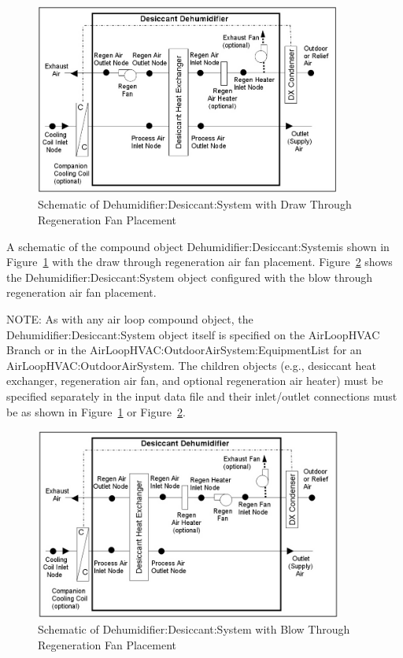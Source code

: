 \begin{figure}[hbtp] %
\centering
\includegraphics[width=0.9\textwidth, height=0.9\textheight, keepaspectratio=true]{media/image409.png}
\caption{Schematic of Dehumidifier:Desiccant:System with Draw Through Regeneration Fan Placement \protect \label{fig:schematic-of-dehumidifier-desiccant-system}}
\end{figure}

A schematic of the compound object Dehumidifier:Desiccant:Systemis shown in Figure~\ref{fig:schematic-of-dehumidifier-desiccant-system} with the draw through regeneration air fan placement. Figure~\ref{fig:schematic-of-dehumidifier-desiccant-system-001} shows the Dehumidifier:Desiccant:System object configured with the blow through regeneration air fan placement.

NOTE: As with any air loop compound object, the Dehumidifier:Desiccant:System object itself is specified on the AirLoopHVAC Branch or in the AirLoopHVAC:OutdoorAirSystem:EquipmentList for an AirLoopHVAC:OutdoorAirSystem. The children objects (e.g., desiccant heat exchanger, regeneration air fan, and optional regeneration air heater) must be specified separately in the input data file and their inlet/outlet connections must be as shown in Figure~\ref{fig:schematic-of-dehumidifier-desiccant-system} or Figure~\ref{fig:schematic-of-dehumidifier-desiccant-system-001}.

\begin{figure}[hbtp] %
\centering
\includegraphics[width=0.9\textwidth, height=0.9\textheight, keepaspectratio=true]{media/image410.png}
\caption{Schematic of Dehumidifier:Desiccant:System with Blow Through Regeneration Fan Placement \protect \label{fig:schematic-of-dehumidifier-desiccant-system-001}}
\end{figure}

